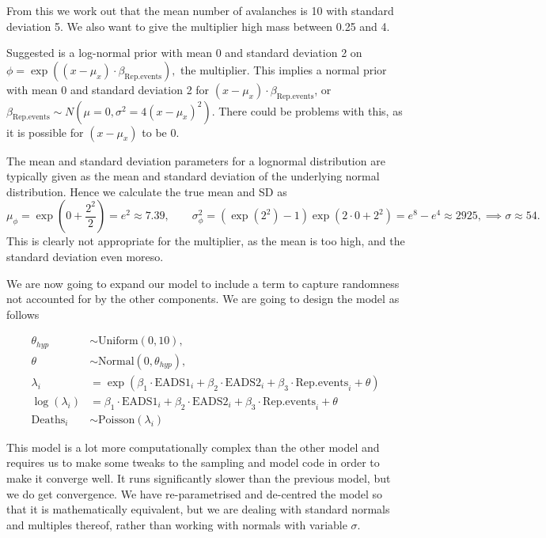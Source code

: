 \documentclass[10pt]{extarticle}
\begin{document}
From this we work out that the mean number of avalanches is 10 with standard deviation 5. We also want to give the multiplier high mass between 0.25 and 4. 

Suggested is a log-normal prior with mean 0 and standard deviation 2 on $\phi = \exp((x-\mu_x)\cdot\beta_{\mathrm{Rep.events}}),$ the multiplier. This implies a normal prior with mean 0 and standard deviation 2 for $(x-\mu_x)\cdot\beta_{\mathrm{Rep.events}}$, or $\beta_{\mathrm{Rep.events}} \sim N(\mu = 0, \sigma^2 = 4(x-\mu_x)^2).$ There could be problems with this, as it is possible for $(x-\mu_x)$ to be 0. 

The mean and standard deviation parameters for a lognormal distribution are typically given as the mean and standard deviation of the underlying normal distribution. Hence we calculate the true mean and SD as \[\mu_{\phi} = \exp\left(0 + \frac{2^2}{2}\right) = e^2 \approx 7.39, \qquad \sigma^2_{\phi} = (\exp(2^2)-1)\exp(2\cdot0 + 2^2) = e^8 - e^4 \approx 2925, \implies \sigma \approx 54.\] This is clearly not appropriate for the multiplier, as the mean is too high, and the standard deviation even moreso.

We are now going to expand our model to include a term to capture randomness not accounted for by the other components. We are going to design the model as follows

\begin{align*}
\theta_{hyp} &\sim \mathrm{Uniform}(0, 10),\\
\theta &\sim \mathrm{Normal}(0, \theta_{hyp}),\\
\lambda_i &= \exp(\beta_1 \cdot \mathrm{EADS1}_i + \beta_2 \cdot \mathrm{EADS2}_i + \beta_3 \cdot \mathrm{Rep.events}_i + \theta)\\
\log(\lambda_i) &= \beta_1 \cdot \mathrm{EADS1}_i + \beta_2 \cdot \mathrm{EADS2}_i + \beta_3 \cdot \mathrm{Rep.events}_i + \theta\\
\mathrm{Deaths}_i &\sim \mathrm{Poisson}(\lambda_i)
\end{align*} 

This model is a lot more computationally complex than the other model and requires us to make some tweaks to the sampling and model code in order to make it converge well. It runs significantly slower than the previous model, but we do get convergence. We have re-parametrised and de-centred the model so that it is mathematically equivalent, but we are dealing with standard normals and multiples thereof, rather than working with normals with variable $\sigma$. 
\end{document}
